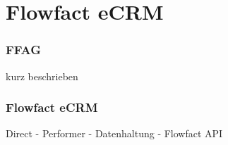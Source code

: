 \part{Flowfact eCRM}
\label{part:flowfact}

\section{FFAG}
kurz beschrieben

\section{Flowfact eCRM}

Direct - Performer - Datenhaltung - Flowfact API

